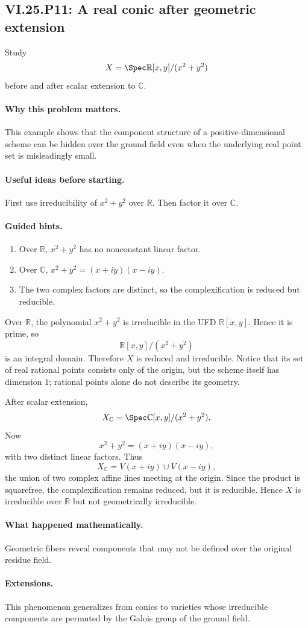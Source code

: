 \subsection*{VI.25.P11: A real conic after geometric extension}
\begin{problem}\label{prob:vi25-p11}
Study
\[
X=\Spec\mathbb R[x,y]/(x^2+y^2)
\]
before and after scalar extension to \(\mathbb C\).
\end{problem}

\ifdefined\FullProblemDossiers
\paragraph{Why this problem matters.}
This example shows that the component structure of a positive-dimensional scheme can be hidden over the ground field even when the underlying real point set is misleadingly small.

\paragraph{Useful ideas before starting.}
First use irreducibility of \(x^2+y^2\) over \(\mathbb R\).  Then factor it over \(\mathbb C\).

\paragraph{Guided hints.}
\begin{enumerate}
\item Over \(\mathbb R\), \(x^2+y^2\) has no nonconstant linear factor.
\item Over \(\mathbb C\), \(x^2+y^2=(x+iy)(x-iy)\).
\item The two complex factors are distinct, so the complexification is reduced but reducible.
\end{enumerate}

\begin{solution}
Over \(\mathbb R\), the polynomial \(x^2+y^2\) is irreducible in the UFD \(\mathbb R[x,y]\).  Hence it is prime, so
\[
\mathbb R[x,y]/(x^2+y^2)
\]
is an integral domain.  Therefore \(X\) is reduced and irreducible.  Notice that its set of real rational points consists only of the origin, but the scheme itself has dimension \(1\); rational points alone do not describe its geometry.

After scalar extension,
\[
X_{\mathbb C}
=
\Spec\mathbb C[x,y]/(x^2+y^2).
\]
Now
\[
x^2+y^2=(x+iy)(x-iy),
\]
with two distinct linear factors.  Thus
\[
X_{\mathbb C}
=
V(x+iy)\cup V(x-iy),
\]
the union of two complex affine lines meeting at the origin.  Since the product is squarefree, the complexification remains reduced, but it is reducible.  Hence \(X\) is irreducible over \(\mathbb R\) but not geometrically irreducible.
\end{solution}

\paragraph{What happened mathematically.}
Geometric fibers reveal components that may not be defined over the original residue field.

\paragraph{Extensions.}
This phenomenon generalizes from conics to varieties whose irreducible components are permuted by the Galois group of the ground field.
\fi
